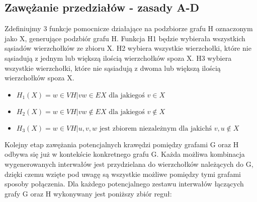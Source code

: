 \documentclass[11pt]{article}
\begin{document}
\subsection{Zawężanie przedziałów - zasady A-D}
Zdefiniujmy 3 funkcje pomocnicze działające na podzbiorze grafu H oznaczonym jako X, generujące podzbiór grafu H. 
Funkcja H1 będzie wybierała wszystkich sąsiadów wierzchołków ze zbioru X.
H2 wybiera wszystkie wierzchołki, które nie sąsiadują z jednym lub większą ilością wierzchołków spoza X. 
H3 wybiera wszystkie wierzchołki, które nie sąsiadują z dwoma lub większą ilością wierzchołków spoza X.
\begin{itemize}
    
  \item   $H_1(X) = { w \in VH | vw \in EX \textrm{ dla jakiegoś } v \in X }$ 
  
  \item   $H_2(X) = { w \in VH | vw \notin EX \textrm{ dla jakiegoś } v \notin X}$
  
  \item   $H_3(X) = { w \in VH | { u, v, w } \textrm{ jest zbiorem niezależnym dla jakichś } v, u \notin X}$ 
\end{itemize}
Kolejny etap zawężania potencjalnych krawędzi pomiędzy grafami G oraz H odbywa się już w kontekście konkretnego grafu G. Każda możliwa kombinacja wygenerowanych interwałów jest  przydzielana do wierzchołków należących do G, dzięki czemu wzięte pod uwagę są wszystkie możliwe pomiędzy tymi grafami sposoby połączenia. Dla każdego potencjalnego zestawu interwałów łączących grafy G oraz H wykonywany jest poniższy zbiór reguł:
\end{document}
